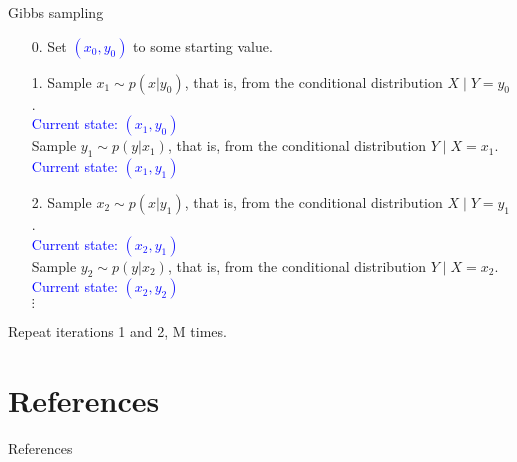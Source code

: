 \documentclass{beamer}					%
\begin{document}
\begin{frame}{Gibbs sampling}
\begin{enumerate}
\item[0.] Set \textcolor{blue}{$(x_0,y_0)$} to some starting value.
\item[1.] Sample $x_1\sim p(x|y_0)$, that is, from the conditional distribution $X\mid Y=y_0$. \\
\textcolor{blue}{Current state: $(x_1, y_0)$}\\
          Sample $y_1\sim p(y|x_1)$, that is, from the conditional distribution $Y\mid X=x_1$.\\
    \textcolor{blue}{      Current state: $(x_1, y_1)$}\\
\item[2.] Sample $x_2\sim p(x|y_1)$, that is, from the conditional distribution $X\mid Y=y_1$. \\
    \textcolor{blue}{      Current state: $(x_2, y_1)$}\\
          Sample $y_2\sim p(y|x_2)$, that is, from the conditional distribution $Y\mid X=x_2$. \\
            \textcolor{blue}{      Current state: $(x_2, y_2)$}\\
        $\vdots$
\end{enumerate}
Repeat iterations 1 and 2, M times. 
\end{frame}



\section{References}

\begin{frame}[allowframebreaks]{References}
	\tiny
	
\end{frame}
\end{document}
